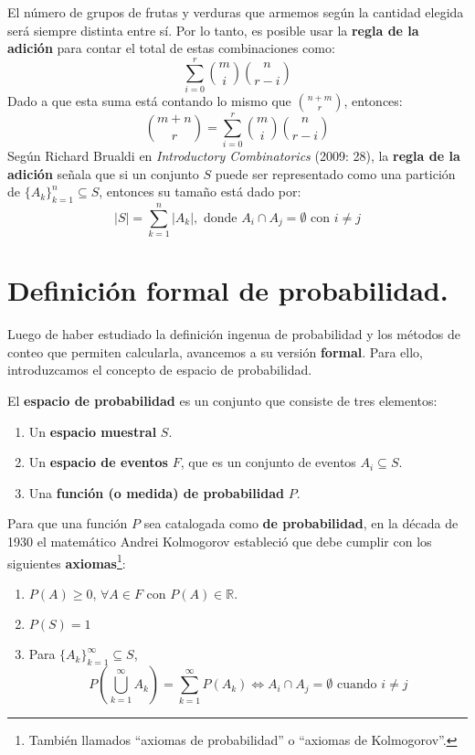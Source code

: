 \documentclass[12pt]{article}
\begin{document}
El número de grupos de frutas y verduras que armemos según la cantidad elegida será siempre distinta entre sí. Por lo tanto, es posible usar la \textbf{regla de la adición} para contar el total de estas combinaciones como:
\[
  \sum_{i = 0}^{r} \binom{m}{i} \binom{n}{r - i}
\]
Dado a que esta suma está contando lo mismo que $\binom{n + m}{r}$, entonces:
\[
  \binom{m + n}{r} = \sum_{i = 0}^{r} \binom{m}{i} \binom{n}{r - i}
\]
Según Richard Brualdi en \textit{Introductory Combinatorics} (2009: 28), la \textbf{regla de la adición} señala que si un conjunto $S$ puede ser representado como una partición de $\{A_{k}\}_{k = 1}^{n} \subseteq S$, entonces su tamaño está dado por:
\[
  |S| = \sum_{k = 1}^{n} |A_{k}|,
  \text{ donde } A_{i} \cap A_{j} = \emptyset \text{ con } i \neq j
\]


\section{Definición formal de probabilidad.}

Luego de haber estudiado la definición ingenua de probabilidad y los métodos de conteo que permiten calcularla, avancemos a su versión \textbf{formal}. Para ello, introduzcamos el concepto de espacio de probabilidad.

El \textbf{espacio de probabilidad} es un conjunto que consiste de tres elementos:

\begin{enumerate}
\item Un \textbf{espacio muestral} $S$.
\item Un \textbf{espacio de eventos} $F$, que es un conjunto de eventos $A_{i} \subseteq S$.
\item Una \textbf{función (o medida) de probabilidad} $P$.
\end{enumerate}

Para que una función $P$ sea catalogada como \textbf{de probabilidad}, en la década de 1930 el matemático Andrei Kolmogorov estableció que debe cumplir con los siguientes \textbf{axiomas}\footnote{También llamados ``axiomas de probabilidad'' o ``axiomas de Kolmogorov''.}:

\begin{enumerate}
\item $P(A) \geq 0$, $\forall A \in F$ con $P(A) \in \mathbb{R}$.
\item $P(S) = 1$
\item Para $\{A_{k}\}_{k = 1}^{\infty} \subseteq S$,
\[
  P\left(\bigcup_{k = 1}^{\infty} A_{k}\right) = \sum_{k = 1}^{\infty} P(A_{k})
  \iff A_{i} \cap A_{j} = \emptyset \text{ cuando } i \neq j
\]
\end{enumerate}
\end{document}
